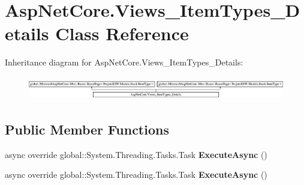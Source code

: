 \hypertarget{class_asp_net_core_1_1_views___item_types___details}{}\section{Asp\+Net\+Core.\+Views\+\_\+\+Item\+Types\+\_\+\+Details Class Reference}
\label{class_asp_net_core_1_1_views___item_types___details}
Inheritance diagram for Asp\+Net\+Core.\+Views\+\_\+\+Item\+Types\+\_\+\+Details\+:\begin{figure}[H]
\begin{center}
\leavevmode
\includegraphics[height=1.027523cm]{class_asp_net_core_1_1_views___item_types___details}
\end{center}
\end{figure}
\subsection*{Public Member Functions}
\begin{DoxyCompactItemize}
\item 
\mbox{\label{class_asp_net_core_1_1_views___item_types___details_ad171e2ab881c3db151b9b583ac53947b}} 
async override global\+::\+System.\+Threading.\+Tasks.\+Task {\bfseries Execute\+Async} ()
\item 
\mbox{\label{class_asp_net_core_1_1_views___item_types___details_ad171e2ab881c3db151b9b583ac53947b}} 
async override global\+::\+System.\+Threading.\+Tasks.\+Task {\bfseries Execute\+Async} ()
\end{DoxyCompactItemize}
